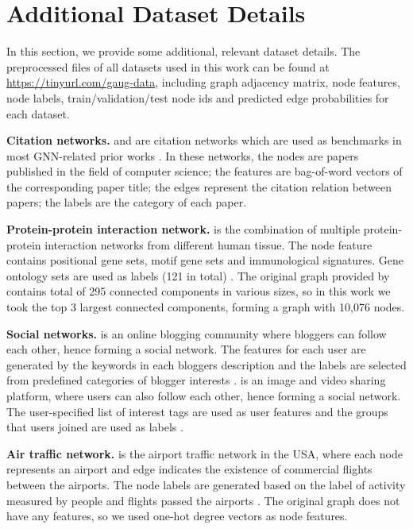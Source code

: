 \documentclass[letterpaper]{article} \usepackage{aaai21}  \usepackage{times}  \usepackage{helvet} \usepackage{courier}  \usepackage[hyphens]{url}  \usepackage{graphicx} \urlstyle{rm} \def\UrlFont{\rm}  \usepackage{natbib}  \usepackage{caption} \frenchspacing  \setlength{\pdfpagewidth}{8.5in}  \setlength{\pdfpageheight}{11in}
\begin{document}
\section{Additional Dataset Details}
\label{appn:data}
In this section, we provide some additional, relevant dataset details. The preprocessed files of all datasets used in this work can be found at \url{https://tinyurl.com/gaug-data}, including graph adjacency matrix, node features, node labels, train/validation/test node ids and predicted edge probabilities for each dataset.

\noindent \textbf{Citation networks.} \cora and \citeseer are citation networks which are used as benchmarks in most GNN-related prior works \cite{kipf2016semi, velivckovic2017graph, rong2019dropedge, chen2019measuring}. In these networks, the nodes are papers published in the field of computer science; the features are bag-of-word vectors of the corresponding paper title; the edges represent the citation relation between papers; the labels are the category of each paper.

\noindent \textbf{Protein-protein interaction network.} \ppi is the combination of multiple protein-protein interaction networks from different human tissue. The node feature contains positional gene sets, motif gene sets and immunological signatures. Gene ontology sets are used as labels (121 in total) \cite{hamilton2017inductive}. The original graph provided by \cite{hamilton2017inductive} contains total of 295 connected components in various sizes, so in this work we took the top 3 largest connected components, forming a graph with 10,076 nodes. 

\noindent \textbf{Social networks.} \blogc is an online blogging community where bloggers can follow each other,  hence forming a social network. The features for each user are generated by the keywords in each bloggers description and the labels are selected from predefined categories of blogger interests \cite{huang2017label}. \flickr is an image and video sharing platform, where users can also follow each other, hence forming a social network. The user-specified list of interest tags are used as user features and the groups that users joined are used as labels \cite{huang2017label}.

\noindent \textbf{Air traffic network.} \airusa is the airport traffic network in the USA, where each node represents an airport and edge indicates the existence of commercial flights between the airports. The node labels are generated based on the label of activity measured by people and flights passed the airports \cite{wu2019net}. The original graph does not have any features, so we used one-hot degree vectors as node features.
\end{document}
